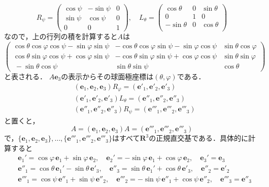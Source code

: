 \[
   R_{\psi} = 
    \begin{pmatrix}
      \cos \psi& -\sin\psi&0\\
      \sin\psi& \cos\psi&0\\
      0&0&1
   \end{pmatrix},\quad
   L_{\theta} = 
   \begin{pmatrix}
      \cos \theta& 0&\sin \theta\\
      0&1&0\\
      -\sin \theta&0& \cos \theta\\
   \end{pmatrix}
\]
なので，上の行列の積を計算すると$A$は
\[
   \begin{pmatrix}
      \cos \theta\cos \varphi\cos\psi - \sin \varphi\sin \psi&
         -\cos \theta\cos \varphi\sin\psi - \sin \varphi\cos \psi&
         \sin\theta\cos \varphi\\
      \cos \theta\sin \varphi\cos\psi + \cos \varphi\sin \psi&
         -\cos \theta\sin \varphi\sin\psi + \cos \varphi\cos \psi&
         \sin\theta\sin \varphi\\\
      -\sin \theta\cos\psi&\sin \theta\sin \psi&\cos \theta
   \end{pmatrix}
\]
と表される．
$A\mathbf e_3$の表示からその球面極座標は$(\theta, \varphi)$である．
\[
\begin{split}
	&( \mathbf e_1,  \mathbf e_2,  \mathbf e_3)R_{\varphi}
	=( \mathbf e'_1,  \mathbf e'_2,  \mathbf e'_3)\\
	&( \mathbf e'_1,  \mathbf e'_2,  \mathbf e'_3)L_{\theta}
	=( \mathbf e''_1,  \mathbf e''_2,  \mathbf e''_3)\\
	&( \mathbf e''_1,  \mathbf e''_2,  \mathbf e''_3)R_{\psi}
	=( \mathbf e'''_1,  \mathbf e'''_2,  \mathbf e'''_3)
\end{split}
\]
と置くと，
\[
   A
   =( \mathbf e_1,  \mathbf e_2,  \mathbf e_3)
   A
   =( \mathbf e'''_1,  \mathbf e'''_2,  \mathbf e'''_3)
\]
で，$\{\mathbf e_1,  \mathbf e_2,  \mathbf e_3\},\dots, 
\{\mathbf e'''_1,  \mathbf e'''_2,  \mathbf e'''_3\}$はすべて$\mathbf R^3$の正規直交基である．具体的に計算すると
\[
\begin{split}
   &\mathbf e_1'
   =\cos\varphi \,\mathbf e_1+ \sin\varphi \,\mathbf e_2,\quad
   \mathbf e_2'
   =-\sin\varphi \,\mathbf e_1+ \cos\varphi \,\mathbf e_2,\quad
   \mathbf e_3'
   =\mathbf e_3
   \\
   &\mathbf e''_1
   =
   \cos \theta\,\mathbf e_1'-\sin\theta\,\mathbf e'_3, \quad
   \mathbf e''_3
   =
   \sin \theta\,\mathbf e_1'+\cos\theta\,\mathbf e'_3, \quad
   \mathbf e''_2
   =
   \mathbf e'_2
   \\
   &\mathbf e'''_1
   =\cos\psi\, \mathbf e''_1+ \sin\psi\, \mathbf e''_2,\quad
   \mathbf e'''_2
   =-\sin\psi\, \mathbf e''_1+ \cos\psi\, \mathbf e''_2,\quad
   \mathbf e'''_3
   =\mathbf e''_3
\end{split}
\]
